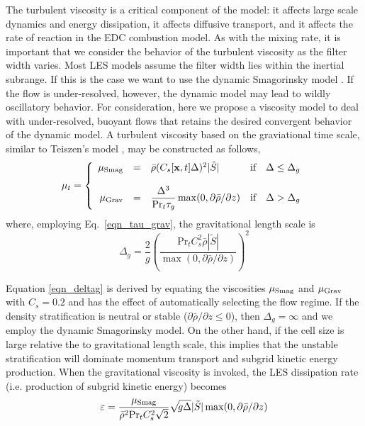 The turbulent viscosity is a critical component of the model: it affects large scale dynamics and energy dissipation, it affects diffusive transport, and it affects the rate of reaction in the EDC combustion model.  As with the mixing rate, it is important that we consider the behavior of the turbulent viscosity as the filter width varies.  Most LES models assume the filter width lies within the inertial subrange.  If this is the case we want to use the dynamic Smagorinsky model \cite{Germano:1991,Moin:1991,Smagorinsky:1}.  If the flow is under-resolved, however, the dynamic model may lead to wildly oscillatory behavior.  For consideration, here we propose a viscosity model to deal with under-resolved, buoyant flows that retains the desired convergent behavior of the dynamic model.  A turbulent viscosity based on the graviational time scale, similar to Teiszen's model \cite{Teiszen:2004b}, may be constructed as follows,
\begin{equation}
\label{eqn_muturb}
\mu_t = \left\{ \begin{array}{rcll} \mu_{\mbox{\scriptsize Smag}}&=&\bar{\rho} (C_s[\mathbf{x},t] \Delta)^2 |\tilde{S}| & \mbox{if} \quad \Delta\le\Delta_g \\ 
\\
\mu_{\mbox{\scriptsize Grav}} &=& \displaystyle \frac{\Delta^3}{\mbox{Pr}_t \tau_g} \max(0,\partial \bar{\rho}/\partial z) & \mbox{if} \quad \Delta > \Delta_g  \end{array} \right.
\end{equation}
where, employing Eq.~\ref{eqn_tau_grav}, the gravitational length scale is
\begin{equation}
\label{eqn_deltag}
\Delta_g = \frac{2}{g} \left(\frac{\mbox{Pr}_t C_s^2 \bar{\rho} |\tilde{S}| }{\max(0,\partial \bar{\rho}/\partial z) } \right)^2
\end{equation}

Equation \ref{eqn_deltag}  is derived by equating the viscosities $\mu_{\mbox{\scriptsize Smag}}$ and $\mu_{\mbox{\scriptsize Grav}}$ with $C_s=0.2$ and has the effect of automatically selecting the flow regime.  If the density stratification is neutral or stable ($\partial \bar{\rho}/\partial z \le 0$), then $\Delta_g = \infty$ and we employ the dynamic Smagorinsky model.  On the other hand, if the cell size is large relative the to gravitational length scale, this implies that the unstable stratification will dominate momentum transport and subgrid kinetic energy production.  When the gravitational viscosity is invoked, the LES dissipation rate (i.e. production of subgrid kinetic energy) becomes
\begin{equation}
\label{eqn_buoyancy_production}
\varepsilon = \frac{\mu_{\mbox{\scriptsize Smag}}}{\bar{\rho}^2 \mbox{Pr}_t C_s^2 \sqrt{2}} \sqrt{\!g\Delta} |\tilde{S}| \max(0,\partial \bar{\rho}/\partial z) \end{equation}


